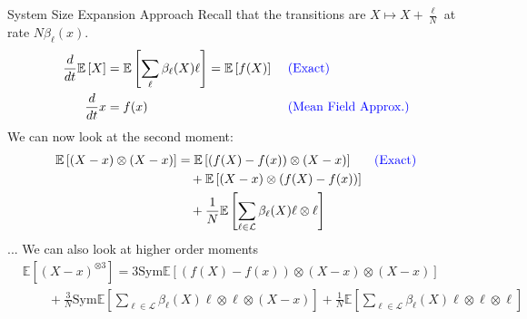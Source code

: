 \documentclass{beamer}
\newcommand\dt{\frac{d}{dt}}
\newcommand\esp[1]{\mathbb{E}\left[#1\right]}
\newcommand\blue[1]{{\color{blue}#1}}
\newcommand\calL{\mathcal{L}}
\begin{document}
\begin{frame}{System Size Expansion Approach}
  Recall that the transitions are $X\mapsto X+\frac\ell N$ at rate
  $N\beta_\ell(x)$. 
  \begin{align*}
    \dt \esp{X} &= \esp{\sum_{\ell}\beta_\ell(X)\ell} =
    \esp{f(X)} && \text{ \blue{(Exact)}}\\
    \dt x &= f(x) && \text{ \blue{(Mean Field Approx.)}}
  \end{align*}\pause
  We can now look at the second moment:
  \begin{align*}
    \esp{(X-x)\otimes(X-x)}
    &=\esp{(f(X)-f(x))\otimes (X-x)} &\text{\blue{(Exact)}}\\
    &\quad+\esp{(X-x)\otimes(f(X)-f(x))}\\
    &\quad+\frac1N\esp{\sum_{\ell\in\calL}\beta_\ell(X)\ell\otimes\ell}
  \end{align*}
  \pause
  ... We can also look at higher order moments
  \begin{align*}
    &\esp{(X-x)^{\otimes3}}
    =3\mathrm{Sym}\esp{(f(X)-f(x))\otimes(X-x)\otimes(X-x)}\\
    &\qquad+\frac3N\mathrm{Sym}\esp{\sum_{\ell\in\calL}\beta_\ell(X)\ell\otimes\ell\otimes(X-x)}+\frac1N\esp{\sum_{\ell\in\calL}\beta_\ell(X)\ell\otimes\ell\otimes\ell}
  \end{align*}
\end{frame}
\end{document}
